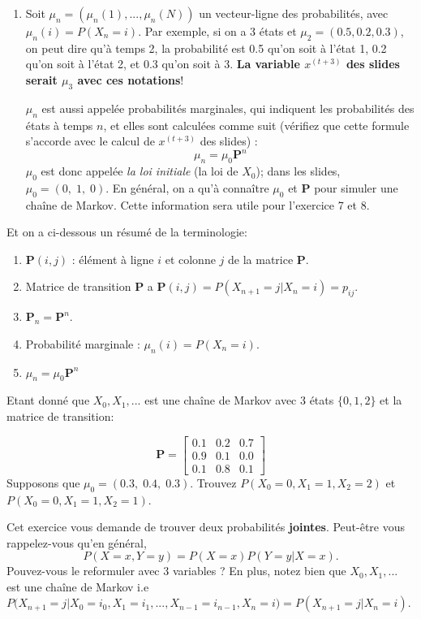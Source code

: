 \begin{Exercice}[15 minutes]
\begin{enumerate}
\item Soit $\mu_n = (\mu_n(1), ..., \mu_n(N))$ un vecteur-ligne des probabilités, avec $\mu_n(i) = P(X_n=i)$. Par exemple, si on a 3 états et $\mu_2 = (0.5, 0.2, 0.3)$, on peut dire qu'à temps 2, la probabilité est 0.5 qu'on soit à l'état 1, 0.2 qu'on soit à l'état 2, et 0.3 qu'on soit à 3. \textbf{La variable $x^{(t+3)}$ des slides serait $\mu_3$ avec ces notations}!

$\mu_n$ est aussi appelée probabilités marginales, qui indiquent les probabilités des états à temps $n$, et elles sont calculées comme suit (vérifiez que cette formule s'accorde avec le calcul de $x^{(t+3)}$ des slides) :
\[ 
\mu_n = \mu_0 \mathbf{P}^n
\]
$\mu_0$ est donc appelée \textit{la loi initiale} (la loi de $X_0$); dans les slides, $\mu_0 = (0,\; 1, \; 0)$. En général, on a qu'à connaître $\mu_0$ et $\mathbf{P}$ pour simuler une chaîne de Markov. Cette information sera utile pour l'exercice 7 et 8. \\ 
\end{enumerate}

Et on a ci-dessous un résumé de la terminologie:

\begin{enumerate}
    \item $\mathbf{P}(i,j)$ : élément à ligne $i$ et colonne $j$ de la matrice $\mathbf{P}$.
    \item Matrice de transition $\mathbf{P}$ a $\mathbf{P}(i,j) = P(X_{n+1}=j|X_n=i)=p_{ij}$.
    \item $\mathbf{P}_n = \mathbf{P}^n$.
    \item Probabilité marginale : $\mu_n(i) = P(X_n = i)$.
    \item $\mu_n = \mu_0 \mathbf{P}^n$
\end{enumerate}

Etant donné que $X_0, X_1, ...$ est une chaîne de Markov avec 3 états $\{0, 1, 2\}$ et la matrice de transition:

\[ 
\mathbf{P} =
\begin{bmatrix}
0.1 & 0.2 & 0.7 \\
0.9 & 0.1 & 0.0 \\
0.1 & 0.8 & 0.1
\end{bmatrix}
\]
Supposons que $\mu_0 = (0.3, \; 0.4, \; 0.3)$. Trouvez $P(X_0 = 0, X_1=1, X_2=2)$ et $P(X_0=0, X_1=1, X_2=1)$.

\begin{conseil}
    Cet exercice vous demande de trouver deux probabilités \textbf{jointes}. Peut-être vous rappelez-vous qu'en général, 
    \[ 
    P(X=x, Y=y) = P(X=x)P(Y=y|X=x).
    \]
    Pouvez-vous le reformuler avec 3 variables ? En plus, notez bien que $X_0, X_1, ...$ est une chaîne de Markov i.e $P\Big(X_{n+1}=j | X_0=i_0, X_1=i_1, ... , X_{n-1}=i_{n-1},X_n=i\Big) = P\left(X_{n+1}=j | X_n=i\right)$. 
\end{conseil}


\end{Exercice}
